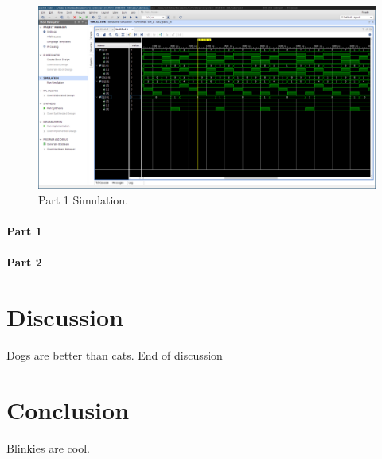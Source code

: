 \documentclass{article}
\begin{document}
    \begin{figure}[b!]
        \includegraphics[width=\linewidth]{MUX_DEMUX.png}
        \caption{Part 1 Simulation.}
        \label{fig:part1_sim}
    \end{figure}

    \paragraph{Part 1}


    \paragraph{Part 2}


    \section{Discussion}
    Dogs are better than cats.
    End of discussion

    \section{Conclusion}
    Blinkies are cool.
\end{document}
